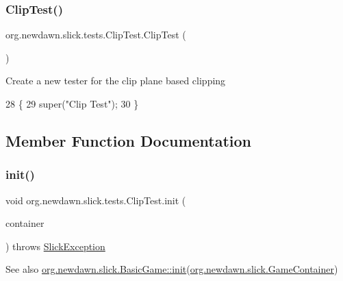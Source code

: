 \subsubsection{\texorpdfstring{Clip\+Test()}{ClipTest()}}
{\footnotesize\ttfamily org.\+newdawn.\+slick.\+tests.\+Clip\+Test.\+Clip\+Test (\begin{DoxyParamCaption}{ }\end{DoxyParamCaption})\hspace{0.3cm}{\ttfamily [inline]}}

Create a new tester for the clip plane based clipping 
\begin{DoxyCode}
28                       \{
29         super(\textcolor{stringliteral}{"Clip Test"});
30     \}
\end{DoxyCode}


\subsection{Member Function Documentation}
\mbox{\label{classorg_1_1newdawn_1_1slick_1_1tests_1_1_clip_test_af5a7bcf3e72268bc2ba84cb8ceda43da}} 
\subsubsection{\texorpdfstring{init()}{init()}}
{\footnotesize\ttfamily void org.\+newdawn.\+slick.\+tests.\+Clip\+Test.\+init (\begin{DoxyParamCaption}\item[{\mbox{\hyperlink{classorg_1_1newdawn_1_1slick_1_1_game_container}{Game\+Container}}}]{container }\end{DoxyParamCaption}) throws \mbox{\hyperlink{classorg_1_1newdawn_1_1slick_1_1_slick_exception}{Slick\+Exception}}\hspace{0.3cm}{\ttfamily [inline]}}

\begin{DoxySeeAlso}{See also}
\mbox{\hyperlink{classorg_1_1newdawn_1_1slick_1_1_basic_game_a8af0900217e4d389249f71367b22d114}{org.\+newdawn.\+slick.\+Basic\+Game\+::init}}(\mbox{\hyperlink{classorg_1_1newdawn_1_1slick_1_1_game_container}{org.\+newdawn.\+slick.\+Game\+Container}}) 
\end{DoxySeeAlso}


